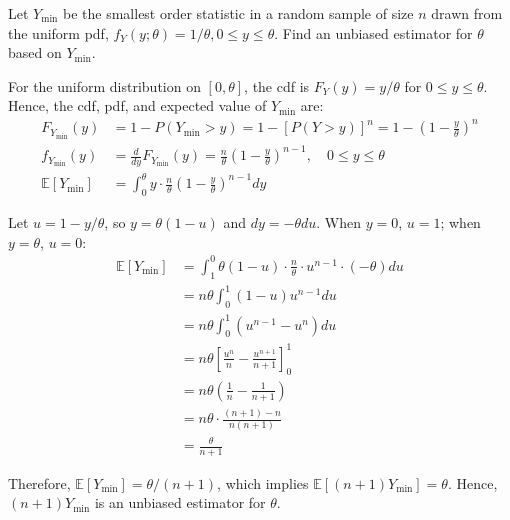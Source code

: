\documentclass{article}
\newcommand{\E}{\mathbb{E}}
\begin{document}
\begin{probset}
\newpage

\begin{prob}[\textbf{5.4.6}]
    Let $Y_{\min}$ be the smallest order statistic in a random sample of size $n$ drawn from the uniform pdf, $f_Y(y; \theta) = 1/\theta, 0 \leq y \leq \theta$. Find an unbiased estimator for $\theta$ based on $Y_{\min}$.

    \begin{soln}
        For the uniform distribution on $[0, \theta]$, the cdf is $F_Y(y) = y/\theta$ for $0 \leq y \leq \theta$. Hence, the cdf, pdf, and expected value of $Y_{\min}$ are:
        \begin{align*}
            F_{Y_{\min}}(y) &= 1 - P(Y_{\min} > y) = 1 - [P(Y > y)]^n = 1 - \left(1 - \frac{y}{\theta}\right)^n \\
            f_{Y_{\min}}(y) &= \frac{d}{dy} F_{Y_{\min}}(y) = \frac{n}{\theta} \left(1 - \frac{y}{\theta}\right)^{n-1}, \quad 0 \leq y \leq \theta \\
            \E[Y_{\min}] &= \int_0^{\theta} y \cdot \frac{n}{\theta} \left(1 - \frac{y}{\theta}\right)^{n-1} dy
        \end{align*}
        
        Let $u = 1 - y/\theta$, so $y = \theta(1-u)$ and $dy = -\theta du$. When $y = 0$, $u = 1$; when $y = \theta$, $u = 0$:
        \begin{align*}
            \E[Y_{\min}] &= \int_1^0 \theta(1-u) \cdot \frac{n}{\theta} \cdot u^{n-1} \cdot (-\theta) du \\
            &= n\theta \int_0^1 (1-u) u^{n-1} du \\
            &= n\theta \int_0^1 (u^{n-1} - u^n) du \\
            &= n\theta \left[\frac{u^n}{n} - \frac{u^{n+1}}{n+1}\right]_0^1 \\
            &= n\theta \left(\frac{1}{n} - \frac{1}{n+1}\right) \\
            &= n\theta \cdot \frac{(n+1) - n}{n(n+1)} \\
            &= \frac{\theta}{n+1}
        \end{align*}
        
        Therefore, $\E[Y_{\min}] = \theta/(n+1)$, which implies $\E[(n+1)Y_{\min}] = \theta$. Hence, $(n+1)Y_{\min}$ is an unbiased estimator for $\theta$.
    \end{soln}
\end{prob}

\newpage


\end{probset}
\end{document}
